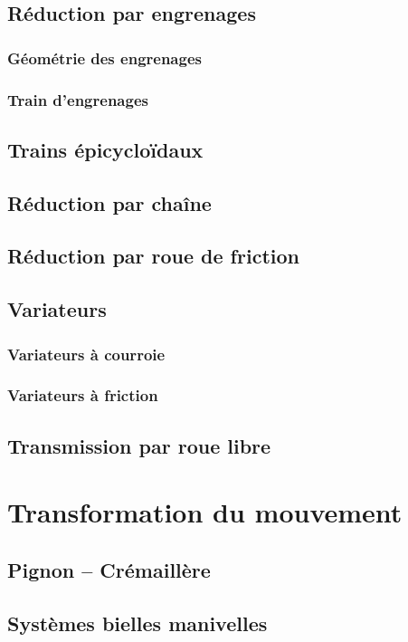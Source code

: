 \documentclass[11pt,oneside]{article}
\begin{document}
\subsection{Réduction par engrenages}	

\subsubsection{Géométrie des engrenages}

\subsubsection{Train d'engrenages}

\subsection{Trains épicycloïdaux}

\subsection{Réduction par chaîne}
\subsection{Réduction par roue de friction}
\subsection{Variateurs}
 \subsubsection{Variateurs à courroie}
 \subsubsection{Variateurs à friction}
\subsection{Transmission par roue libre}
\section{Transformation du mouvement}
\subsection{Pignon -- Crémaillère}
\subsection{Systèmes bielles manivelles}
\end{document}
